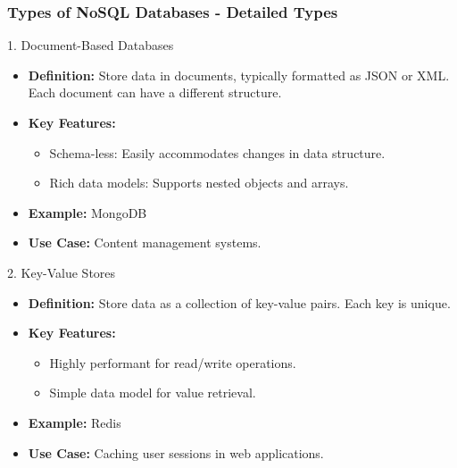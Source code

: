 \documentclass[aspectratio=169]{beamer}
\begin{document}
\begin{frame}[fragile]
    \frametitle{Types of NoSQL Databases - Detailed Types}
    \begin{block}{1. Document-Based Databases}
        \begin{itemize}
            \item \textbf{Definition:} Store data in documents, typically formatted as JSON or XML. Each document can have a different structure.
            \item \textbf{Key Features:}
            \begin{itemize}
                \item Schema-less: Easily accommodates changes in data structure.
                \item Rich data models: Supports nested objects and arrays.
            \end{itemize}
            \item \textbf{Example:} MongoDB
            \item \textbf{Use Case:} Content management systems.
        \end{itemize}
    \end{block}
    
    \begin{block}{2. Key-Value Stores}
        \begin{itemize}
            \item \textbf{Definition:} Store data as a collection of key-value pairs. Each key is unique.
            \item \textbf{Key Features:}
            \begin{itemize}
                \item Highly performant for read/write operations.
                \item Simple data model for value retrieval.
            \end{itemize}
            \item \textbf{Example:} Redis
            \item \textbf{Use Case:} Caching user sessions in web applications.
        \end{itemize}
    \end{block}
\end{frame}
\end{document}
